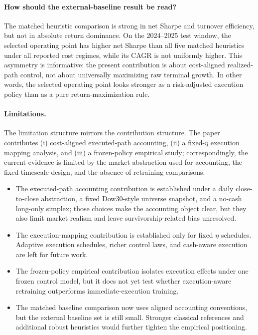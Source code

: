 \documentclass[10pt,twocolumn]{article}
\begin{document}
\paragraph{How should the external-baseline result be read?}
The matched heuristic comparison is strong in net Sharpe and turnover efficiency, but not in absolute return dominance. On the 2024--2025 test window, the selected operating point has higher net Sharpe than all five matched heuristics under all reported cost regimes, while its CAGR is not uniformly higher. This asymmetry is informative: the present contribution is about cost-aligned realized-path control, not about universally maximizing raw terminal growth. In other words, the selected operating point looks stronger as a risk-adjusted execution policy than as a pure return-maximization rule.

\paragraph{Limitations.}
The limitation structure mirrors the contribution structure. The paper contributes (i) cost-aligned executed-path accounting, (ii) a fixed-$\eta$ execution mapping analysis, and (iii) a frozen-policy empirical study; correspondingly, the current evidence is limited by the market abstraction used for accounting, the fixed-timescale design, and the absence of retraining comparisons.
\begin{itemize}[leftmargin=*,itemsep=1pt]
\item The executed-path accounting contribution is established under a daily close-to-close abstraction, a fixed Dow30-style universe snapshot, and a no-cash long-only simplex; those choices make the accounting object clear, but they also limit market realism and leave survivorship-related bias unresolved.
\item The execution-mapping contribution is established only for fixed $\eta$ schedules. Adaptive execution schedules, richer control laws, and cash-aware execution are left for future work.
\item The frozen-policy empirical contribution isolates execution effects under one frozen control model, but it does not yet test whether execution-aware retraining outperforms immediate-execution training.
\item The matched baseline comparison now uses aligned accounting conventions, but the external baseline set is still small. Stronger classical references and additional robust heuristics would further tighten the empirical positioning.
\end{itemize}
\end{document}
